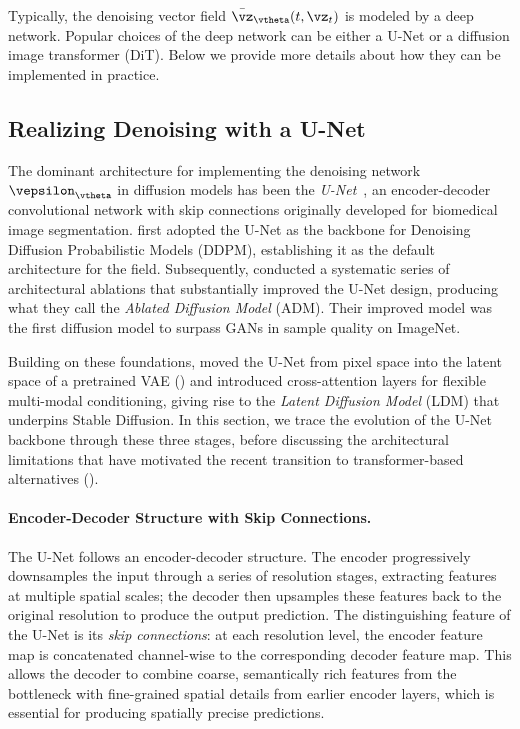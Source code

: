 \documentclass[../../book-main.tex]{subfiles}
\begin{document}
Typically, the denoising vector field \(\bar{\vz}_{\vtheta}(t, \vz_t)\) is modeled by a deep network.
Popular choices of the deep network can be either a U-Net or a diffusion image transformer (DiT).
Below we provide more details about how they can be implemented in practice.

\subsection{Realizing Denoising with a U-Net}
\label{sec:UNet-implement}

The dominant architecture for implementing the denoising network \(\vepsilon_{\vtheta}\) in diffusion models has been the \textit{U-Net}~\citep{ronneberger2015unet}, an encoder-decoder convolutional network with skip connections originally developed for biomedical image segmentation.
\citet{ho2020denoising} first adopted the U-Net as the backbone for Denoising Diffusion Probabilistic Models (DDPM), establishing it as the default architecture for the field.
Subsequently, \citet{dhariwal2021diffusion} conducted a systematic series of architectural ablations that substantially improved the U-Net design, producing what they call the \textit{Ablated Diffusion Model} (ADM).
Their improved model was the first diffusion model to surpass GANs in sample quality on ImageNet.

Building on these foundations, \citet{rombach2022high} moved the U-Net from pixel space into the latent space of a pretrained VAE () and introduced cross-attention layers for flexible multi-modal conditioning, giving rise to the \textit{Latent Diffusion Model} (LDM) that underpins Stable Diffusion.
In this section, we trace the evolution of the U-Net backbone through these three stages, before discussing the architectural limitations that have motivated the recent transition to transformer-based alternatives ().

\paragraph{Encoder-Decoder Structure with Skip Connections.}
The U-Net follows an encoder-decoder structure.
The encoder progressively downsamples the input through a series of resolution stages, extracting features at multiple spatial scales;
the decoder then upsamples these features back to the original resolution to produce the output prediction.
The distinguishing feature of the U-Net is its \textit{skip connections}: at each resolution level, the encoder feature map is concatenated channel-wise to the corresponding decoder feature map.
This allows the decoder to combine coarse, semantically rich features from the bottleneck with fine-grained spatial details from earlier encoder layers, which is essential for producing spatially precise predictions.
\end{document}
